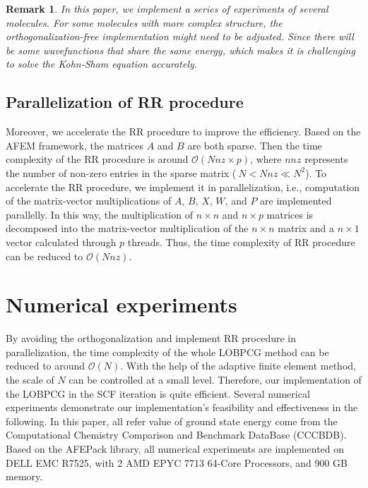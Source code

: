 \documentclass[12pt]{article}
\newtheorem{remark}{Remark} \newtheorem{example}{Example}
\numberwithin{figure}{section}
\numberwithin{table}{section}
\begin{document}
\begin{remark}
	In this paper, we implement a series of experiments of several molecules. For some molecules with more complex structure, the orthogonalization-free implementation might need to be adjusted. Since there will be some wavefunctions that share the same energy, which makes it is challenging to solve the Kohn-Sham equation accurately.
\end{remark}

\subsection{Parallelization of RR procedure}
Moreover, we accelerate the RR procedure to improve the efficiency. Based on the AFEM framework, the matrices $A$ and $B$ are both sparse. Then the time complexity of the RR procedure is around $\mathcal{O}(Nnz\times p)$, where $nnz$ represents the number of non-zero entries in the sparse matrix ($\ N < Nnz \ll N^2$). To accelerate the RR procedure, we implement it in parallelization, i.e., computation of the matrix-vector multiplications of $A$, $B$, $X$, $W$, and $P$ are implemented parallelly. In this way, the multiplication of $n\times n$ and $n\times p$ matrices is decomposed into the matrix-vector multiplication of the $n\times n$ matrix and a $n\times 1$ vector calculated through $p$ threads. Thus, the time complexity of RR procedure can be reduced to $\mathcal{O}(Nnz)$. 


	
\section{Numerical experiments}
By avoiding the orthogonalization and implement RR procedure in parallelization, the time complexity of the whole LOBPCG method can be reduced to around $\mathcal{O}(N)$. With the help of the adaptive finite element method, the scale of $N$ can be controlled at a small level. Therefore, our implementation of the LOBPCG in the SCF iteration is quite efficient. Several numerical experiments demonstrate our implementation's feasibility and effectiveness in the following. In this paper, all refer value of ground state energy come from the Computational Chemistry Comparison and Benchmark DataBase (CCCBDB). Based on the AFEPack library, all numerical experiments are implemented on DELL EMC R7525, with 2 AMD EPYC 7713 64-Core Processors, and 900 GB memory.
\end{document}
